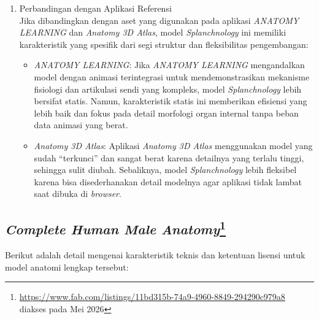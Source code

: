 \begin{enumerate}
                \item Perbandingan dengan Aplikasi Referensi\\
                Jika dibandingkan dengan aset yang digunakan pada aplikasi \textit{ANATOMY LEARNING} dan \textit{Anatomy 3D Atlas}, model \textit{Splanchnology} ini memiliki karakteristik yang spesifik dari segi struktur dan fleksibilitas pengembangan:
                \begin{itemize}
                    \item \textit{ANATOMY LEARNING}: Jika \textit{ANATOMY LEARNING} mengandalkan model dengan animasi terintegrasi untuk mendemonstrasikan mekanisme fisiologi dan artikulasi sendi yang kompleks, model \textit{Splanchnology} lebih bersifat statis. Namun, karakteristik statis ini memberikan efisiensi yang lebih baik dan fokus pada detail morfologi organ internal tanpa beban data animasi yang berat.
                    
                    \item \textit{Anatomy 3D Atlas}: Aplikasi \textit{Anatomy 3D Atlas} menggunakan model yang sudah ``terkunci'' dan sangat berat karena detailnya yang terlalu tinggi, sehingga sulit diubah. Sebaliknya, model \textit{Splanchnology} lebih fleksibel karena bisa disederhanakan detail modelnya agar aplikasi tidak lambat saat dibuka di \textit{browser}.
                \end{itemize}
            \end{enumerate}
            
            
      
        \subsection[\textit{Complete Human Male Anatomy}]{\textit{Complete Human Male Anatomy}\footnote{\url{https://www.fab.com/listings/11bd315b-74a9-4960-8849-294290c979a8} diakses pada Mei 2026}}
               
        Berikut adalah detail mengenai karakteristik teknis dan ketentuan lisensi untuk model anatomi lengkap tersebut:
        
